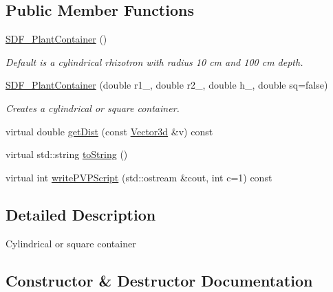 \subsection*{Public Member Functions}
\begin{DoxyCompactItemize}
\item 
\mbox{\label{classCPlantBox_1_1SDF__PlantContainer_a669ad56f2a4f5180c7bbceddc630ecbd}} 
\hyperlink{classCPlantBox_1_1SDF__PlantContainer_a669ad56f2a4f5180c7bbceddc630ecbd}{S\+D\+F\+\_\+\+Plant\+Container} ()
\begin{DoxyCompactList}\small\item\em Default is a cylindrical rhizotron with radius 10 cm and 100 cm depth. \end{DoxyCompactList}\item 
\hyperlink{classCPlantBox_1_1SDF__PlantContainer_a8ee0710b04756de7a1f172bdabd84ded}{S\+D\+F\+\_\+\+Plant\+Container} (double r1\+\_\+, double r2\+\_\+, double h\+\_\+, double sq=false)
\begin{DoxyCompactList}\small\item\em Creates a cylindrical or square container. \end{DoxyCompactList}\item 
virtual double \hyperlink{classCPlantBox_1_1SDF__PlantContainer_a952d14f86430d008b1d83fe7c047c0c2}{get\+Dist} (const \hyperlink{classCPlantBox_1_1Vector3d}{Vector3d} \&v) const
\item 
virtual std\+::string \hyperlink{classCPlantBox_1_1SDF__PlantContainer_acbbd3751b289a98858be25c20b4f7206}{to\+String} ()
\item 
virtual int \hyperlink{classCPlantBox_1_1SDF__PlantContainer_a8ca6514a0f414aaa70526575d931edda}{write\+P\+V\+P\+Script} (std\+::ostream \&cout, int c=1) const
\end{DoxyCompactItemize}


\subsection{Detailed Description}
Cylindrical or square container 

\subsection{Constructor \& Destructor Documentation}
\mbox{\label{classCPlantBox_1_1SDF__PlantContainer_a8ee0710b04756de7a1f172bdabd84ded}} 
